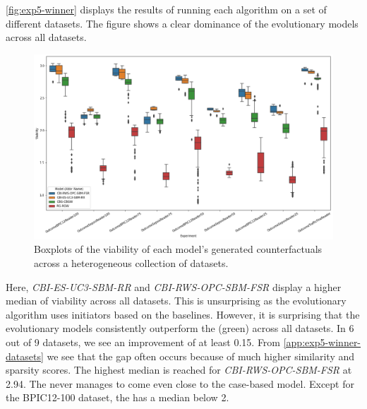 \documentclass[./../../paper.tex]{subfiles}
\begin{document}
\autoref{fig:exp5-winner} displays the results of running each algorithm on a set of different datasets. The figure shows a clear dominance of the evolutionary models across all datasets. 

\begin{figure}[htbp]
    \centering
    \includegraphics[width=\textwidth]{figures/generated/exp5_winner_overall.png}
    \caption{Boxplots of the viability of each model's generated counterfactuals across a heterogeneous collection of datasets.}
    \label{fig:exp5-winner}
\end{figure}

Here, \emph{CBI-ES-UC3-SBM-RR} and \emph{CBI-RWS-OPC-SBM-FSR} display a higher median of viability across all datasets. 
This is unsurprising as the evolutionary algorithm uses initiators based on the baselines. 
However, it is surprising that the evolutionary models consistently outperform the \ModelCBG (green) across all datasets. In 6 out of 9 datasets, we see an improvement of at least 0.15. 
From \autoref{app:exp5-winner-datasets} we see that the gap often occurs because of much higher similarity and sparsity scores. The highest median is reached for \emph{CBI-RWS-OPC-SBM-FSR} at 2.94. 
The \ModelRNG never manages to come even close to the case-based model. Except for the BPIC12-100 dataset, the \ModelRNG has a median below 2. 
\end{document}
